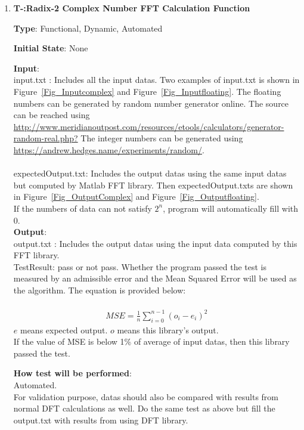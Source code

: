 \documentclass[12pt, titlepage]{article}
\newcounter{tnum}
\begin{document}
\begin{enumerate}

\item{\textbf{T-\thetnum \label{R2CFFT}:Radix-2 Complex Number FFT Calculation Function}}

\textbf {Type}: Functional, Dynamic, Automated
					
\textbf {Initial State}: None
					
\textbf {Input}:\\{\large input.txt} :  Includes all the input datas. Two examples of input.txt is shown in Figure~\ref{Fig_Inputcomplex} and Figure~\ref{Fig_Inputfloating}. The floating numbers can be generated by random number generator online. The source can be reached using    \url  {http://www.meridianoutpost.com/resources/etools/calculators/generator-random-real.php?} The integer numbers can be generated using \url {https://andrew.hedges.name/experiments/random/}.\\\\ 
{\large expectedOutput.txt}:  Includes the output datas using the same input datas but computed by Matlab FFT library. Then expectedOutput.txts  are shown in Figure~\ref{Fig_OutputComplex} and Figure~\ref{Fig_Outputfloating}. \\ 
If the numbers of data can not satisfy $2^n$, program will automatically fill with 0.\\
					
\textbf {Output}: \\{\large output.txt} : Includes the output datas using the input data computed by this FFT library.\\
{\large TestResult}: pass or not pass. Whether the program passed the test is measured by an admissible error and the Mean Squared Error will be used as the algorithm. The equation is provided below:\\\\
\begin{gather}
MSE = \frac{1}{n}\sum_{i=0}^{n-1} (o_i - e_i)^2
\end{gather}
$e$ means expected output. $o$ means this library's output.\\
If the value of MSE is below 1\% of average of input datas, then this library passed the test.


			
\textbf {How test will be performed}: \\
Automated.\\
For validation purpose, datas should also be compared with results from normal DFT calculations as well. Do the same test as above but fill the output.txt with results from using DFT library.


\end{enumerate}
\end{document}
